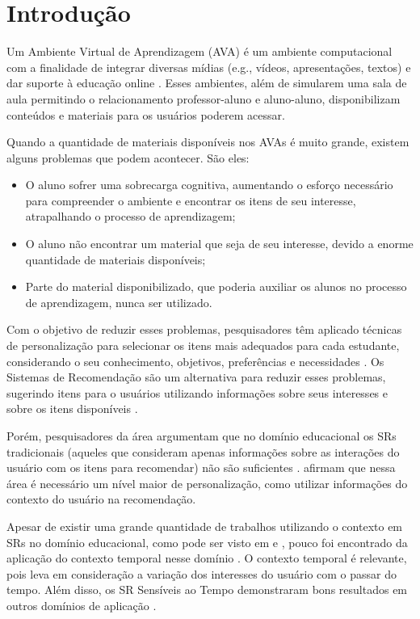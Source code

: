 \chapter{Introdução}\label{introducao}

Um Ambiente Virtual de Aprendizagem (AVA) é um ambiente computacional com a finalidade de integrar diversas mídias
(e.g., vídeos, apresentações, textos) e dar suporte à educação online \cite{drachsler2015panorama}. Esses ambientes, além de simularem uma sala
de aula permitindo o relacionamento professor-aluno e aluno-aluno, disponibilizam conteúdos e materiais para os usuários
poderem acessar.

Quando a quantidade de materiais disponíveis nos AVAs é muito grande, existem alguns problemas que podem acontecer. São eles:

\begin{itemize}
\item O aluno sofrer uma sobrecarga cognitiva, aumentando o esforço necessário para compreender o ambiente
e encontrar os itens de seu interesse, atrapalhando o processo de aprendizagem;
\item O aluno não encontrar um material que seja de seu interesse, devido a enorme quantidade de materiais disponíveis;
\item Parte do material disponibilizado, que poderia auxiliar os alunos no processo de aprendizagem, nunca ser
utilizado.
\end{itemize}

Com o objetivo de reduzir esses problemas, pesquisadores têm aplicado técnicas de personalização para selecionar os
itens mais adequados para cada estudante, considerando o seu conhecimento, objetivos, preferências e necessidades
\cite{brusilovsky1998methods}. Os Sistemas de Recomendação são um alternativa para reduzir esses problemas, sugerindo
itens para o usuários utilizando informações sobre seus interesses e sobre os itens disponíveis \cite{adomavicius2005toward}.

Porém, pesquisadores da área argumentam que no domínio educacional os SRs tradicionais (aqueles que consideram apenas
informações sobre as interações do usuário com os itens para recomendar) não são suficientes \cite{verbert2012context, drachsler2015panorama}.
 afirmam que nessa área é necessário um nível maior de personalização, como utilizar informações
do contexto do usuário na recomendação.

Apesar de existir uma grande quantidade de trabalhos utilizando o contexto em SRs no domínio educacional, como pode ser visto
em  e , pouco foi encontrado da aplicação do contexto
temporal nesse domínio \cite{de2017time}. O contexto temporal é relevante, pois leva em consideração a variação dos
interesses do usuário com o passar do tempo. Além disso, os SR Sensíveis ao Tempo demonstraram bons resultados em outros
domínios de aplicação \cite{campos2014time}.

